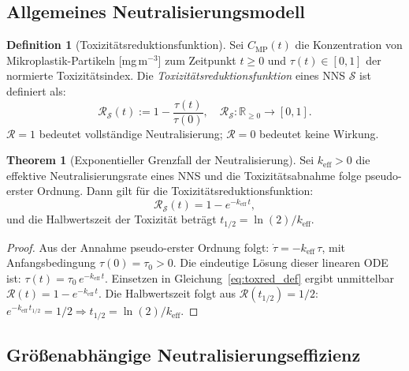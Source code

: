 ﻿\documentclass[12pt,a4paper]{article}
\theoremstyle{definition}
\newtheorem{definition}{Definition}[section]
\newtheorem{theorem}{Theorem}[section]
\theoremstyle{remark}
\newcommand{\R}{\mathbb{R}}
\begin{document}
\subsection{Allgemeines Neutralisierungsmodell}

\begin{definition}[Toxizitätsreduktionsfunktion]
\label{def:toxred}
Sei $C_{\text{MP}}(t)$ die Konzentration von Mikro\-plastik-Partikeln [mg\,m$^{-3}$]
zum Zeitpunkt $t \geq 0$ und $\tau(t) \in [0,1]$ der normierte Toxizitätsindex.
Die \emph{Toxizitätsreduktionsfunktion} eines NNS $\mathcal{S}$ ist definiert als:
\begin{equation}
  \mathcal{R}_{\mathcal{S}}(t) := 1 - \frac{\tau(t)}{\tau(0)},
  \quad \mathcal{R}_{\mathcal{S}} : \R_{\geq 0} \to [0,1].
  \label{eq:toxred_def}
\end{equation}
$\mathcal{R} = 1$ bedeutet vollständige Neutralisierung; $\mathcal{R} = 0$
bedeutet keine Wirkung.
\end{definition}

\begin{theorem}[Exponentieller Grenzfall der Neutralisierung]
\label{thm:exp_limit}
Sei $k_{\text{eff}} > 0$ die effektive Neutralisierungsrate eines NNS und die
Toxizitätsabnahme folge pseudo-erster Ordnung. Dann gilt für die
Toxizitätsreduktionsfunktion:
\begin{equation}
  \mathcal{R}_{\mathcal{S}}(t) = 1 - e^{-k_{\text{eff}}\,t},
  \label{eq:exp_neutral}
\end{equation}
und die Halbwertszeit der Toxizität beträgt $t_{1/2} = \ln(2)/k_{\text{eff}}$.
\end{theorem}

\begin{proof}
Aus der Annahme pseudo-erster Ordnung folgt:
$\dot{\tau} = -k_{\text{eff}}\,\tau$,
mit Anfangsbedingung $\tau(0) = \tau_0 > 0$.
Die eindeutige Lösung dieser linearen ODE ist:
$\tau(t) = \tau_0\,e^{-k_{\text{eff}}\,t}$.
Einsetzen in Gleichung~\eqref{eq:toxred_def} ergibt unmittelbar
$\mathcal{R}(t) = 1 - e^{-k_{\text{eff}}\,t}$.
Die Halbwertszeit folgt aus $\mathcal{R}(t_{1/2}) = 1/2$:
$e^{-k_{\text{eff}}\,t_{1/2}} = 1/2 \Rightarrow
t_{1/2} = \ln(2)/k_{\text{eff}}$. \hfill
\end{proof}

\subsection{Größenabhängige Neutralisierungseffizienz}
\end{document}
